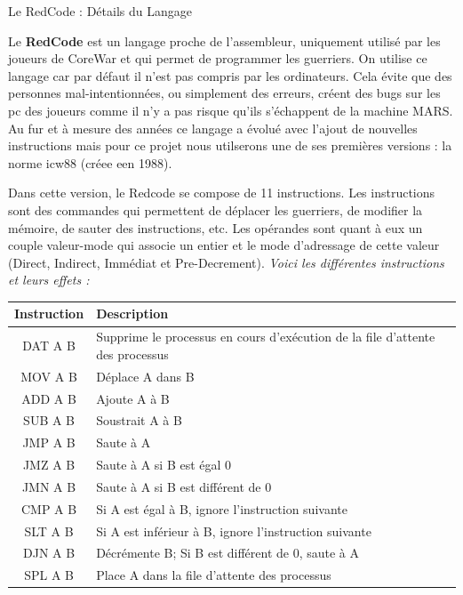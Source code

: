\documentclass[a4paper, 10pt]{article}
\begin{document}
    \begin{section}{Le RedCode : Détails du Langage}
        \par
            Le \textbf{RedCode} est un langage proche de l'assembleur, uniquement utilisé par les joueurs de CoreWar et qui permet de programmer les guerriers. On utilise ce langage car par défaut il n'est pas compris par les ordinateurs. Cela évite que des personnes mal-intentionnées, ou simplement des erreurs, créent des bugs sur les pc des joueurs comme il n'y a pas risque qu'ils s'échappent de la machine MARS. Au fur et à mesure des années ce langage a évolué avec l'ajout de nouvelles instructions mais pour ce projet nous utilserons une de ses premières versions : la norme icw88 (créee een 1988). 
            
            Dans cette version, le Redcode se compose de 11 instructions. Les instructions sont des commandes qui permettent de déplacer les guerriers, de modifier la mémoire, de sauter des instructions, etc. Les opérandes sont quant à eux un couple valeur-mode qui associe un entier et le mode d'adressage de cette valeur (Direct, Indirect, Immédiat et Pre-Decrement).
            \bigskip \newline
                \textit{Voici les différentes instructions et leurs effets :}
            \bigskip

            \begin{tabular}{|c|p{8cm}|}
                \hline
                    \textbf{Instruction} & \textbf{Description} \\
                \hline
                    DAT A B & Supprime le processus en cours d'exécution de la file d'attente des processus \\
                \hline
                    MOV A B & Déplace A dans B \\
                \hline
                    ADD A B & Ajoute A à B \\
                \hline
                    SUB A B & Soustrait A à B \\
                \hline
                    JMP A B & Saute à A \\
                \hline
                    JMZ A B & Saute à A si B est égal 0\\
                \hline
                    JMN A B & Saute à A si B est différent de 0 \\
                \hline
                    CMP A B & Si A est égal à B, ignore l'instruction suivante\\
                \hline
                    SLT A B & Si A est inférieur à B, ignore l'instruction suivante\\
                \hline
                    DJN A B & Décrémente B; Si B est différent de 0, saute à A \\
                \hline
                    SPL A B & Place A dans la file d'attente des processus \\
                \hline
        \end{tabular}


\end{section}
\end{document}
